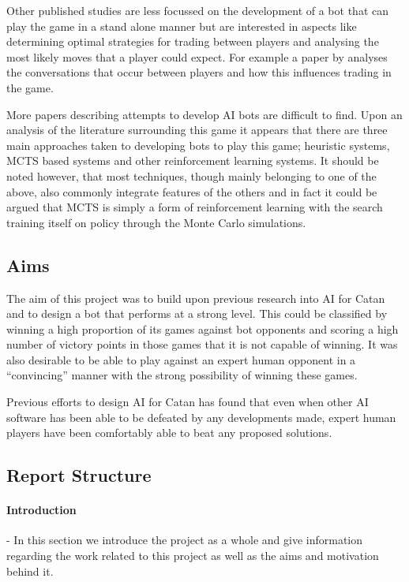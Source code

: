\documentclass[]{article}
\begin{document}
\par Other published studies are less focussed on the development of a bot that can play the game in a stand alone manner but are interested in aspects like determining optimal strategies for trading between players and analysing the most likely moves that a player could expect. For example a paper by \textcite{afantenos2012developing} analyses the conversations that occur between players and how this influences trading in the game.

\par More papers describing attempts to develop AI bots are difficult to find. Upon an analysis of the literature surrounding this game it appears that there are three main approaches taken to developing bots to play this game; heuristic systems, MCTS based systems and other reinforcement learning systems. It should be noted however, that most techniques, though mainly belonging to one of the above, also commonly integrate features of the others and in fact it could be argued that MCTS is simply a form of reinforcement learning with the search training itself on policy through the Monte Carlo simulations.

\subsection{Aims}
The aim of this project was to build upon previous research into AI for Catan and to design a bot that performs at a strong level. This could be classified by winning a high proportion of its games against bot opponents and scoring a high number of victory points in those games that it is not capable of winning. It was also desirable to be able to play against an expert human opponent in a ``convincing'' manner with the strong possibility of winning these games.

\par Previous efforts to design AI for Catan has found that even when other AI software has been able to be defeated by any developments made, expert human players have been comfortably able to beat any proposed solutions. 


\subsection{Report Structure}

\vspace{0.3cm}

\paragraph{\large Introduction}-
\vspace{0.2cm}
\newline In this section we introduce the project as a whole and give information regarding the work related to this project as well as the aims and motivation behind it.
\end{document}
